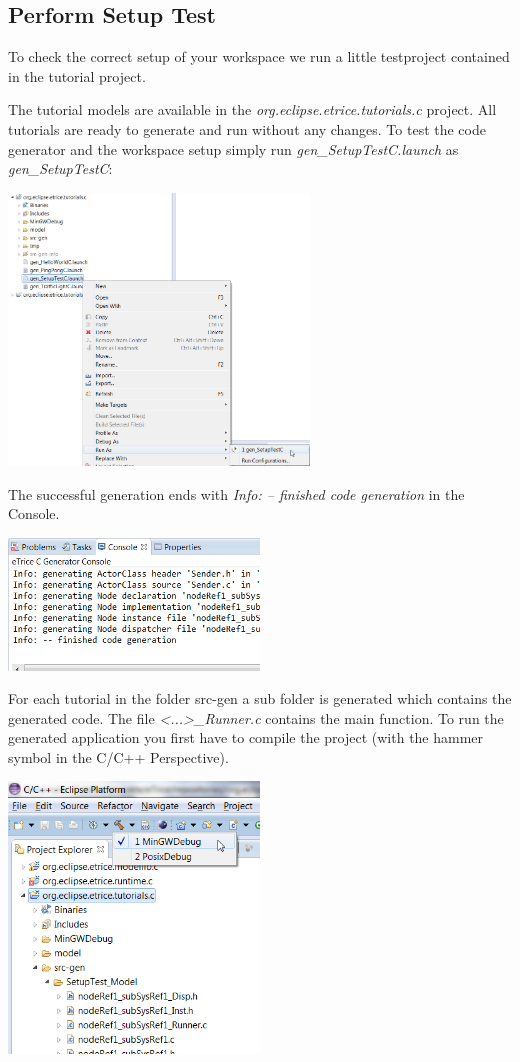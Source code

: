 \subsection{Perform Setup Test}

To check the correct setup of your workspace we run a little testproject contained in the tutorial project.

The tutorial models are available in the  \emph{org.eclipse.etrice.tutorials.c} project. All tutorials are ready to generate and run without any changes. To test the code generator and the workspace setup simply run 
\emph{gen\_SetupTestC.launch} as \emph{gen\_SetupTestC}: 

\includegraphics[width=0.6\textwidth]{images/014-05-gen_SetupTestC.png}

The successful generation ends with \emph{Info: -- finished code generation} in the Console.

\includegraphics[width=0.5\textwidth]{images/014-06-FinishedCodeGeneration.png}

For each tutorial in the folder src-gen a sub folder is generated which contains the generated code. The file \emph{<...>\_Runner.c} contains the main function. To run the generated application you first have to compile the project (with the hammer symbol in the C/C++ Perspective).

\includegraphics[width=0.5\textwidth]{images/014-07-Compile.png}


